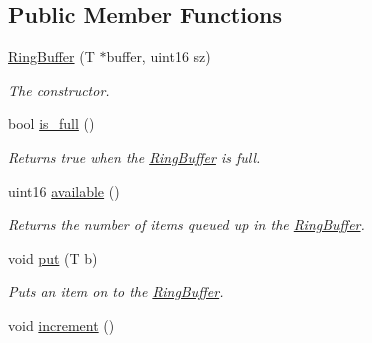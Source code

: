 \subsection*{Public Member Functions}
\begin{DoxyCompactItemize}
\item 
\hyperlink{classetk_1_1_ring_buffer_a57eb84e3d53260344a676666d1b85559}{Ring\-Buffer} (T $\ast$buffer, uint16 sz)
\begin{DoxyCompactList}\small\item\em The constructor. \end{DoxyCompactList}\item 
\hypertarget{classetk_1_1_ring_buffer_a978d9d2868965d77ecc1270d0b54707d}{bool \hyperlink{classetk_1_1_ring_buffer_a978d9d2868965d77ecc1270d0b54707d}{is\-\_\-full} ()}\label{classetk_1_1_ring_buffer_a978d9d2868965d77ecc1270d0b54707d}

\begin{DoxyCompactList}\small\item\em Returns true when the \hyperlink{classetk_1_1_ring_buffer}{Ring\-Buffer} is full. \end{DoxyCompactList}\item 
\hypertarget{classetk_1_1_ring_buffer_a928acf9be50189de076421563446a0f0}{uint16 \hyperlink{classetk_1_1_ring_buffer_a928acf9be50189de076421563446a0f0}{available} ()}\label{classetk_1_1_ring_buffer_a928acf9be50189de076421563446a0f0}

\begin{DoxyCompactList}\small\item\em Returns the number of items queued up in the \hyperlink{classetk_1_1_ring_buffer}{Ring\-Buffer}. \end{DoxyCompactList}\item 
\hypertarget{classetk_1_1_ring_buffer_ac17418eb9abba39351152b7d70a426ae}{void \hyperlink{classetk_1_1_ring_buffer_ac17418eb9abba39351152b7d70a426ae}{put} (T b)}\label{classetk_1_1_ring_buffer_ac17418eb9abba39351152b7d70a426ae}

\begin{DoxyCompactList}\small\item\em Puts an item on to the \hyperlink{classetk_1_1_ring_buffer}{Ring\-Buffer}. \end{DoxyCompactList}\item 
\hypertarget{classetk_1_1_ring_buffer_a251380d6c89541f0be046e6358c2307b}{void \hyperlink{classetk_1_1_ring_buffer_a251380d6c89541f0be046e6358c2307b}{increment} ()}\label{classetk_1_1_ring_buffer_a251380d6c89541f0be046e6358c2307b}


\end{DoxyCompactItemize}
